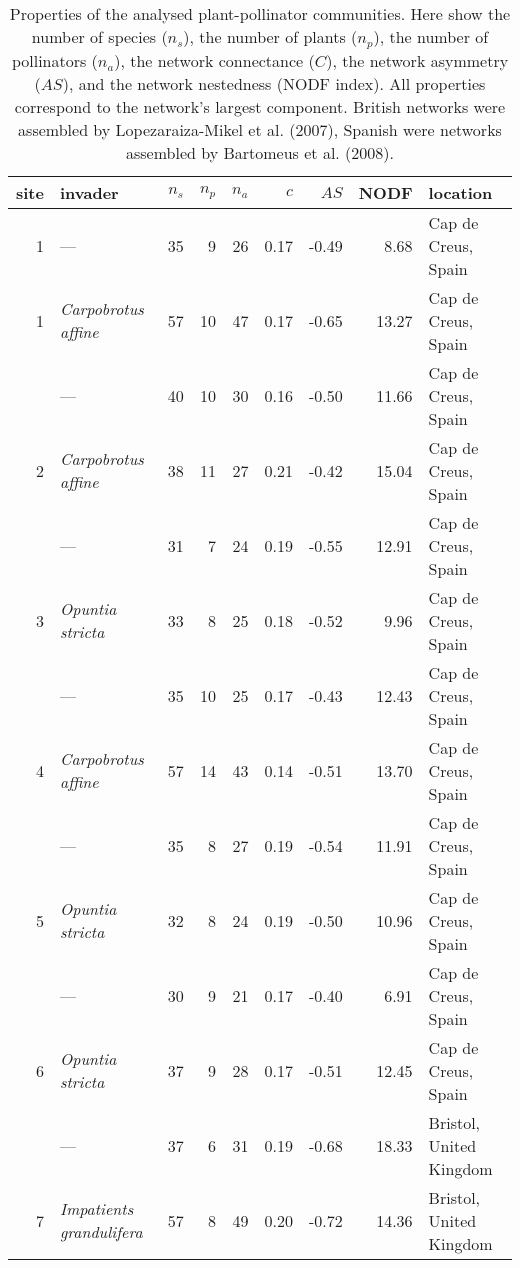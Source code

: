 \documentclass[a4paper]{artikel1}
\theoremstyle{definition}
\theoremstyle{definition}
\theoremstyle{definition}
\theoremstyle{remark}
\begin{document}
\begin{table}

\caption{\label{tab:table-network-properties}Properties of the analysed plant-pollinator communities. Here show the number of species ($n_s$), the number of plants ($n_p$), the number of pollinators ($n_a$), the network connectance ($C$), the network asymmetry ($AS$), and the network nestedness (NODF index). All properties correspond to the network's largest component. British networks were assembled by Lopezaraiza-Mikel et al. (2007), Spanish were networks assembled by Bartomeus et al. (2008).}
\centering
\fontsize{8}{10}\selectfont
\begin{tabular}[t]{rlrrrrrrl}
\toprule
site & invader & $n_s$ & $n_p$ & $n_a$ & $c$ & $AS$ & NODF & location\\
\midrule
1 & — & 35 & 9 & 26 & 0.17 & -0.49 & 8.68 & Cap de Creus, Spain\\
1 & \textit{Carpobrotus affine} & 57 & 10 & 47 & 0.17 & -0.65 & 13.27 & Cap de Creus, Spain\\
\addlinespace
2 & — & 40 & 10 & 30 & 0.16 & -0.50 & 11.66 & Cap de Creus, Spain\\
2 & \textit{Carpobrotus affine} & 38 & 11 & 27 & 0.21 & -0.42 & 15.04 & Cap de Creus, Spain\\
\addlinespace
3 & — & 31 & 7 & 24 & 0.19 & -0.55 & 12.91 & Cap de Creus, Spain\\
3 & \textit{Opuntia stricta} & 33 & 8 & 25 & 0.18 & -0.52 & 9.96 & Cap de Creus, Spain\\
\addlinespace
4 & — & 35 & 10 & 25 & 0.17 & -0.43 & 12.43 & Cap de Creus, Spain\\
4 & \textit{Carpobrotus affine} & 57 & 14 & 43 & 0.14 & -0.51 & 13.70 & Cap de Creus, Spain\\
\addlinespace
5 & — & 35 & 8 & 27 & 0.19 & -0.54 & 11.91 & Cap de Creus, Spain\\
5 & \textit{Opuntia stricta} & 32 & 8 & 24 & 0.19 & -0.50 & 10.96 & Cap de Creus, Spain\\
\addlinespace
6 & — & 30 & 9 & 21 & 0.17 & -0.40 & 6.91 & Cap de Creus, Spain\\
6 & \textit{Opuntia stricta} & 37 & 9 & 28 & 0.17 & -0.51 & 12.45 & Cap de Creus, Spain\\
\addlinespace
7 & — & 37 & 6 & 31 & 0.19 & -0.68 & 18.33 & Bristol, United Kingdom\\
7 & \textit{Impatients grandulifera} & 57 & 8 & 49 & 0.20 & -0.72 & 14.36 & Bristol, United Kingdom\\

\end{tabular}
\end{table}
\end{document}
